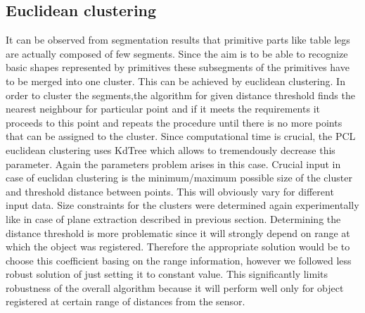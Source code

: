 \documentclass[12pt,oneside]{amsart}
\begin{document}
\subsection{Euclidean clustering}
\indent It can be observed from segmentation results that primitive parts like table legs are actually composed of few segments. Since the aim is to be able to recognize basic shapes represented by primitives these subsegments of the primitives have to be merged into one cluster. This can be achieved by euclidean clustering.
\newline
\indent In order to cluster the segments,the algorithm for given distance threshold finds the nearest neighbour for particular point and if it meets the requirements it proceeds to this point and repeats the procedure until there is no more points that can be assigned to the cluster. Since computational time is crucial, the PCL euclidean clustering uses KdTree which allows to tremendously decrease this parameter. 
Again the parameters problem arises in this case. Crucial input in case of euclidan clustering is the minimum/maximum possible size of the cluster and threshold distance between points. This will obviously vary for different input data. Size constraints for the clusters were determined again experimentally like in case of plane extraction described in previous section. Determining the distance threshold is more problematic since it will strongly depend on range at which the object was registered. Therefore the appropriate solution would be to choose this coefficient basing on the range information, however we followed less robust solution of just setting it to constant value. This significantly limits robustness of the overall algorithm because it will perform well only for object registered at certain range of distances from the sensor. 
\end{document}
